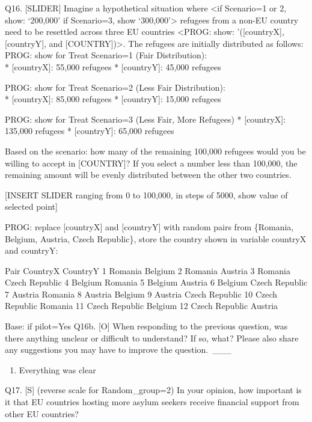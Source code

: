 \documentclass[
  12pt,
  a4paper,
]{article}
\providecommand{\tightlist}{%
  \setlength{\itemsep}{0pt}\setlength{\parskip}{0pt}}
\begin{document}
Q16. {[}SLIDER{]} Imagine a hypothetical situation where \textless if Scenario=1 or 2, show: `200,000' if Scenario=3, show `300,000'\textgreater{} refugees from a non-EU country need to be resettled across three EU countries \textless PROG: show: '({[}countryX{]}, {[}countryY{]}, and {[}COUNTRY{]})\textgreater. The refugees are initially distributed as follows:
PROG: show for Treat Scenario=1 (Fair Distribution):\\
* {[}countryX{]}: 55,000 refugees
* {[}countryY{]}: 45,000 refugees

PROG: show for Treat Scenario=2 (Less Fair Distribution):\\
* {[}countryX{]}: 85,000 refugees
* {[}countryY{]}: 15,000 refugees

PROG: show for Treat Scenario=3 (Less Fair, More Refugees)
* {[}countryX{]}: 135,000 refugees
* {[}countryY{]}: 65,000 refugees

Based on the scenario: how many of the remaining 100,000 refugees would you be willing to accept in {[}COUNTRY{]}? If you select a number less than 100,000, the remaining amount will be evenly distributed between the other two countries.

{[}INSERT SLIDER ranging from 0 to 100,000, in steps of 5000, show value of selected point{]}

PROG: replace {[}countryX{]} and {[}countryY{]} with random pairs from \{Romania, Belgium, Austria, Czech Republic\}, store the country shown in variable countryX and countryY:

Pair CountryX CountryY
1 Romania Belgium
2 Romania Austria
3 Romania Czech Republic
4 Belgium Romania
5 Belgium Austria
6 Belgium Czech Republic
7 Austria Romania
8 Austria Belgium
9 Austria Czech Republic
10 Czech Republic Romania
11 Czech Republic Belgium
12 Czech Republic Austria

Base: if pilot=Yes
Q16b. {[}O{]} When responding to the previous question, was there anything unclear or difficult to understand? If so, what? Please also share any suggestions you may have to improve the question.\,
\_\_\_

\begin{enumerate}
\def\labelenumi{\arabic{enumi}.}
\setcounter{enumi}{97}
\tightlist
\item
  Everything was clear
\end{enumerate}

Q17. {[}S{]} (reverse scale for Random\_group=2) In your opinion, how important is it that EU countries hosting more asylum seekers receive financial support from other EU countries?
\end{document}
